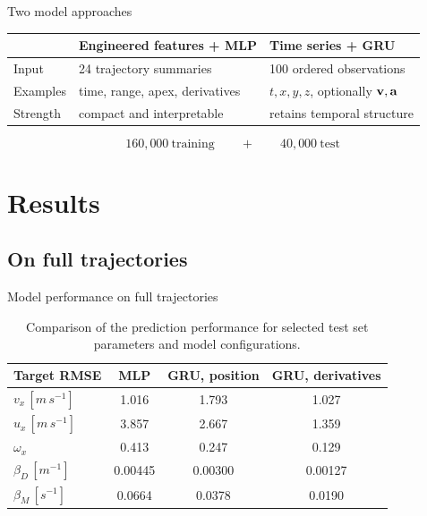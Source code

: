 \documentclass[10pt]{beamer}
\begin{document}
\begin{frame}{Two model approaches}
  \begin{table}
    \centering
    \begin{tabular}{@{}lll@{}}
      \toprule
      & Engineered features + MLP & Time series + GRU \\
      \midrule
      Input
        & 24 trajectory summaries
        & 100 ordered observations \\
      Examples
        & time, range, apex, derivatives
        & $t,x,y,z$, optionally $\vb{v},\vb{a}$ \\
      Strength
        & compact and interpretable
        & retains temporal structure \\
      \bottomrule
    \end{tabular}
  \end{table}

  \vspace{0.55cm}
  \[
    160{,}000\ \text{training}
    \qquad+\qquad
    40{,}000\ \text{test}
  \]
\end{frame}

\section{Results}

\subsection{On full trajectories}

\begin{frame}{Model performance on full trajectories}
  \begin{table}
    \centering
    \begin{tabular}{@{}lccc@{}}
      \toprule
      Target RMSE & MLP & GRU, position & GRU, derivatives \\
      \midrule
      $v_x\,[\unit{m\,s^{-1}}]$
        & \textcolor{accent}{1.016} & 1.793 & 1.027 \\
      $u_x\,[\unit{m\,s^{-1}}]$
        & 3.857 & 2.667 & \textcolor{accent}{1.359} \\
      $\omega_x$
        & 0.413 & 0.247 & \textcolor{accent}{0.129} \\
      $\beta_D\,[\unit{m^{-1}}]$
        & 0.00445 & 0.00300 & \textcolor{accent}{0.00127} \\
      $\beta_M\,[\unit{s^{-1}}]$
        & 0.0664 & 0.0378 & \textcolor{accent}{0.0190} \\
      \bottomrule
    \end{tabular}
    \caption{Comparison of the prediction performance for selected test set parameters and model configurations.}
  \end{table}
\end{frame}
\end{document}
